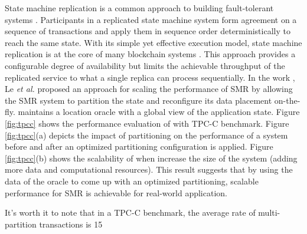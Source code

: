 State machine replication is a common approach to building fault-tolerant
systems \cite{Lam78, Sch90}. Participants in a replicated state machine system
form agreement on a sequence of transactions and apply them in sequence order
deterministically to reach the same state. With its simple yet effective
execution model, state machine replication is at the core of many blockchain
systems \cite{baudet2019state, cachin2016architecture}. This approach provides a
configurable degree of availability but limits the achievable throughput of the
replicated service to what a single replica can process sequentially. In the
work \dynastar \cite{le2019dynastar}, Le \emph{et al.} proposed an approach for
scaling the performance of SMR by allowing the SMR system to partition the state and
reconfigure its data placement on-the-fly. \dynastar maintains a location oracle
with a global view of the application state. Figure \ref{fig:tpcc} shows the
performance evaluation of \dynastar with TPC-C benchmark. Figure
\ref{fig:tpcc}(a) depicts the impact of partitioning on the performance of a
system before and after an optimized partitioning configuration is applied.
Figure \ref{fig:tpcc}(b) shows the scalability of \dynastar when increase the
size of the system (adding more data and computational resources). This result
suggests that by using the data of the oracle to come up with an optimized
partitioning, scalable performance for SMR is achievable for real-world
application.

It's worth it to
 note that in a TPC-C benchmark, the average rate of multi-partition transactions
 is 15\

